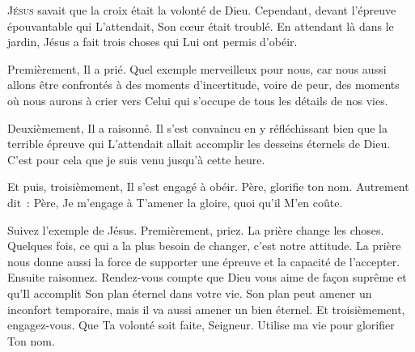 

\lettrine{J}{ésus} savait que la croix était la volonté de Dieu.
 Cependant, devant l'épreuve épouvantable qui L'attendait,
 Son cœur était troublé. En attendant là dans le jardin,
 Jésus a fait trois choses qui Lui ont permis d'obéir.

Premièrement, Il a prié. Quel exemple merveilleux pour nous,
 car nous aussi allons être confrontés à des moments d'incertitude,
 voire de peur, des moments où nous aurons à crier vers Celui
 qui s'occupe de tous les détails de nos vies.


Deuxièmement, Il a raisonné. Il s'est convaincu en y réfléchissant
 bien que la terrible épreuve qui L'attendait allait accomplir
 les desseins éternels de Dieu.
 \og C'est pour cela que je suis venu jusqu'à cette heure. \fg{}

Et puis, troisièmement, Il s'est engagé à obéir.
 \og Père, glorifie ton nom. \fg{}
 Autrement dit~: 
 \og Père, Je m'engage à T'amener la gloire, quoi qu'il M'en coûte. \fg{}

Suivez l'exemple de Jésus. Premièrement, priez.
 La prière change les choses. Quelques fois, 
 ce qui a la plus besoin de changer, c'est notre attitude.
 La prière nous donne aussi la force de supporter une épreuve
 et la capacité de l'accepter. Ensuite \ocadr raisonnez. 
 Rendez-vous compte que Dieu vous aime de façon suprême et qu'Il accomplit
 Son plan éternel dans votre vie.
 Son plan peut amener un inconfort temporaire, mais il va aussi amener
 un bien éternel. Et troisièmement, engagez-vous.
 \og Que Ta volonté soit faite, Seigneur.
 Utilise ma vie pour glorifier Ton nom. \fg{}

\dvrule




